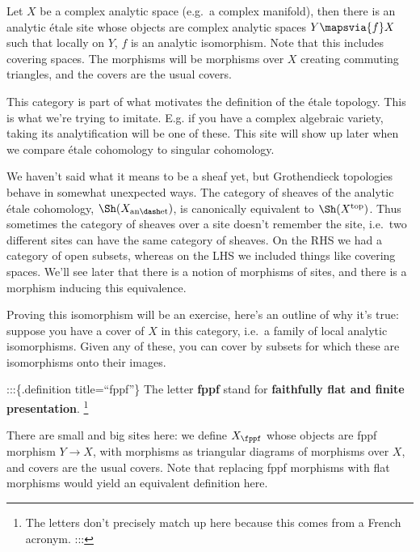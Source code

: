 \begin{example}[?]

Let \(X\) be a complex analytic space (e.g.~a complex manifold), then
there is an analytic étale site whose objects are complex analytic
spaces \(Y\mapsvia{f} X\) such that locally on \(Y\), \(f\) is an
analytic isomorphism. Note that this includes covering spaces. The
morphisms will be morphisms over \(X\) creating commuting triangles, and
the covers are the usual covers.

\end{example}

\begin{remark}

This category is part of what motivates the definition of the étale
topology. This is what we're trying to imitate. E.g. if you have a
complex algebraic variety, taking its analytification will be one of
these. This site will show up later when we compare étale cohomology to
singular cohomology.

\end{remark}

\begin{remark}

We haven't said what it means to be a sheaf yet, but Grothendieck
topologies behave in somewhat unexpected ways. The category of sheaves
of the analytic étale cohomology, \(\Sh(X_{\mathrm{an\dash et}})\), is
canonically equivalent to \(\Sh(X^{\mathrm{top}})\). Thus sometimes the
category of sheaves over a site doesn't remember the site, i.e.~two
different sites can have the same category of sheaves. On the RHS we had
a category of open subsets, whereas on the LHS we included things like
covering spaces. We'll see later that there is a notion of morphisms of
sites, and there is a morphism inducing this equivalence.

Proving this isomorphism will be an exercise, here's an outline of why
it's true: suppose you have a cover of \(X\) in this category, i.e.~a
family of local analytic isomorphisms. Given any of these, you can cover
by subsets for which these are isomorphisms onto their images.

\end{remark}

:::\{.definition title=``fppf''\} The letter \textbf{fppf} stand for
\textbf{faithfully flat and finite presentation}. \footnote{The letters
  don't precisely match up here because this comes from a French
  acronym. :::}

\begin{example}

There are small and big sites here: we define \(X_{\fppf}\) whose
objects are fppf morphism \(Y\to X\), with morphisms as triangular
diagrams of morphisms over \(X\), and covers are the usual covers. Note
that replacing fppf morphisms with flat morphisms would yield an
equivalent definition here.

\end{example}

